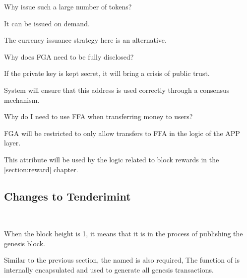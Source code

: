 \begin{ENUMERATE}
    \item Why issue such a large number of tokens?
    \begin{ITEMIZE}
        \item It can be issued on demand.
        \item The currency issuance strategy here is an alternative.
    \end{ITEMIZE}
    \item Why does FGA need to be fully disclosed?
    \begin{ITEMIZE}
        \item If the private key is kept secret, it will bring a crisis of public trust.
        \item System will ensure that this address is used correctly through a consensus mechanism.
    \end{ITEMIZE}
    \item Why do I need to use FFA when transferring money to users?
    \begin{ITEMIZE}
        \item FGA will be restricted to only allow transfers to FFA in the logic of the APP layer.
        \item This attribute will be used by the logic related to block rewards in the \ref{section:reward} chapter.
    \end{ITEMIZE}
\end{ENUMERATE}

\clearpage

\subsection{Changes to Tenderimint}

~\par

When the block height is 1, it means that it is in the process of publishing the genesis block.

Similar to the previous section, the  named  is also required,
The function of  is internally encapsulated and used to generate all genesis transactions.

